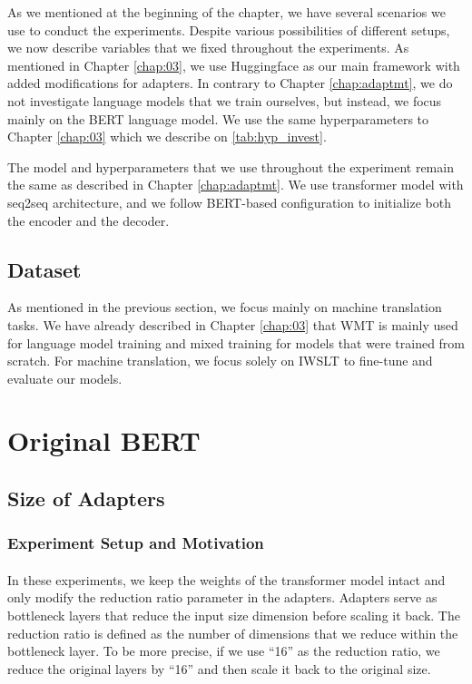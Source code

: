 As we mentioned at the beginning of the chapter, we have several scenarios we use to conduct the experiments. Despite various possibilities of different setups, we now describe variables that we fixed throughout the experiments. As mentioned in Chapter \cref{chap:03}, we use Huggingface as our main framework with added modifications for adapters. In contrary to Chapter \ref{chap:adaptmt}, we do not investigate language models that we train ourselves, but instead, we focus mainly on the BERT language model. We use the same hyperparameters to Chapter \ref{chap:03} which we describe on \cref{tab:hyp_invest}.

The model and hyperparameters that we use throughout the experiment remain the same as described in Chapter \ref{chap:adaptmt}. We use transformer model with seq2seq architecture, and we follow BERT-based configuration to initialize both the encoder and the decoder.

\subsection{Dataset}
As mentioned in the previous section, we focus mainly on machine translation tasks. We have already described in Chapter \ref{chap:03} that WMT is mainly used for language model training and mixed training for models that were trained from scratch. For machine translation, we focus solely on IWSLT to fine-tune and evaluate our models.

\section{Original BERT}
\subsection{Size of Adapters}
\subsubsection{Experiment Setup and Motivation}
\paragraph{}
In these experiments, we keep the weights of the transformer model intact and only modify the reduction ratio parameter in the adapters. Adapters serve as bottleneck layers that reduce the input size dimension before scaling it back. The reduction ratio is defined as the number of dimensions that we reduce within the bottleneck layer. To be more precise, if we use ``16'' as the reduction ratio, we reduce the original layers by ``16'' and then scale it back to the original size.


